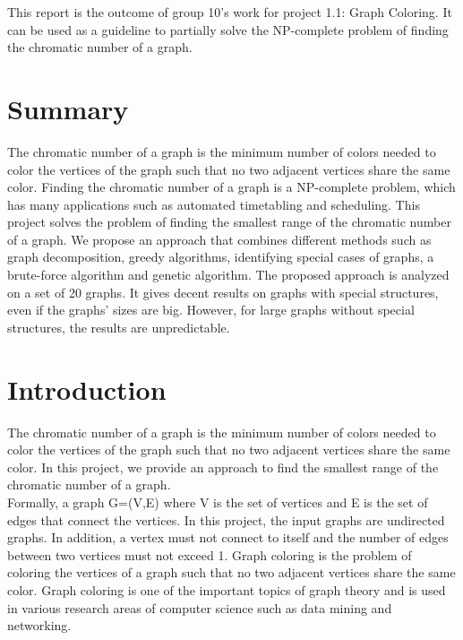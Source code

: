 \documentclass[a4paper]{report}
\begin{document}
	This report is the outcome of group 10's work for project 1.1: Graph Coloring. It can be used as a guideline to partially solve the NP-complete problem of finding the chromatic number of a graph.
	  
	
	\chapter*{Summary}
	The chromatic number of a graph is the minimum number of colors needed to color the vertices of the graph such that no two adjacent vertices share the same color. Finding the chromatic number of a graph is a NP-complete problem, which has many applications such as automated timetabling and scheduling. This project solves the problem of finding the smallest range of the chromatic number of a graph. We propose an approach that combines different methods such as graph decomposition, greedy algorithms, identifying special cases of graphs, a brute-force algorithm and genetic algorithm. The proposed approach is analyzed on a set of 20 graphs. It gives decent results on graphs with special structures, even if the graphs' sizes are big. However, for large graphs without special structures, the results are unpredictable. 
	
	\tableofcontents
	

	
	\chapter{Introduction}
	The chromatic number of a graph is the minimum number of colors needed to color the vertices of the graph such that no two adjacent vertices share the same color. In this project, we provide an approach to find the smallest range of the chromatic number of a graph. \\
	
	Formally, a graph G=(V,E) where V is the set of vertices and E is the set of edges that connect the vertices. In this project, the input graphs are undirected graphs. In addition, a vertex must not connect to itself and the number of edges between two vertices must not exceed 1.  Graph coloring is the problem of coloring the vertices of a graph such that no two adjacent vertices share the same color. Graph coloring is one of the important topics of graph theory and is used in various research areas of computer science such as data mining and networking.\\
	
\end{document}
